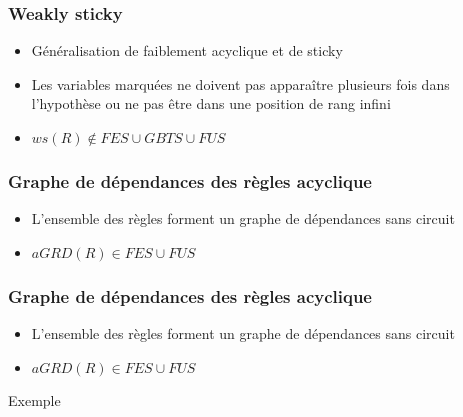 \begin{frame}
	\frametitle{Weakly sticky}
	\begin{itemize}
		\item Généralisation de faiblement acyclique et de sticky
		\item Les variables marquées ne doivent pas apparaître plusieurs fois dans
		l'hypothèse ou ne pas être dans une position de rang infini
		\item $ws(R) \notin FES \cup GBTS \cup FUS$
	\end{itemize}
\end{frame}

\begin{frame}
	\frametitle{Graphe de dépendances des règles acyclique}
	\begin{itemize}
		\item L'ensemble des règles forment un graphe de dépendances sans circuit
		\item $aGRD(R) \in FES \cup FUS$
	\end{itemize}
	\vspace{10mm}
\end{frame}

\begin{frame}
	\frametitle{Graphe de dépendances des règles acyclique}
	\begin{itemize}
		\item L'ensemble des règles forment un graphe de dépendances sans circuit
		\item $aGRD(R) \in FES \cup FUS$
	\end{itemize}
	\vspace{10mm}
	\begin{exampleblock}{Exemple}
		 \\
	\end{exampleblock}
\end{frame}

